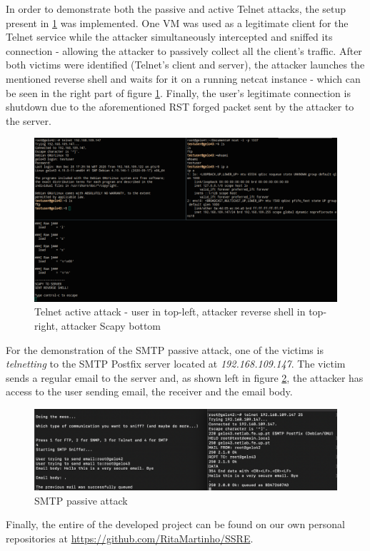 In order to demonstrate both the passive and active Telnet attacks, the setup
present in \ref{fig:TelnetAttack} was implemented.
One VM was used as a legitimate client for the Telnet service while the 
attacker simultaneously intercepted and sniffed its connection - allowing the 
attacker to passively collect all the client's traffic.
After both victims were identified (Telnet's client and server), the attacker 
launches the mentioned reverse shell and waits for it on a running netcat 
instance - which can be seen in the right part of figure \ref{fig:TelnetAttack}.
Finally, the user's legitimate connection is shutdown due to the aforementioned 
RST forged packet sent by the attacker to the server.

\begin{figure}[h!]
    \centering
    \includegraphics[width=1\linewidth,keepaspectratio]{ReverseShell.png}
    \caption{Telnet active attack - user in top-left, attacker reverse shell 
            in top-right, attacker Scapy bottom}
    \label{fig:TelnetAttack}
\end{figure}
\FloatBarrier


For the demonstration of the SMTP passive attack, one of the victims is \textit{telnetting} to the SMTP Postfix server located at \textit{192.168.109.147}. The victim sends a regular email to the server and, as shown left in figure \ref{fig:SMTPPassiveAttack}, the attacker has access to the user sending email, the receiver and the email body. 
\begin{figure}[h!]
    \centering
    \includegraphics[width=1\linewidth,keepaspectratio]{SMTPAttack.png}
    \caption{SMTP passive attack}
    \label{fig:SMTPPassiveAttack}
\end{figure}
\FloatBarrier

Finally, the entire of the developed project can be found on our own personal
repositories at \url{https://github.com/RitaMartinho/SSRE}.
